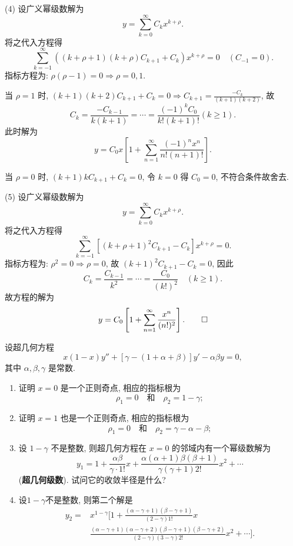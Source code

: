 \begin{solution}
  (4) 设广义幂级数解为
  \[y=\sum_{k=0}^{\infty}C_kx^{k+\rho}.\]
  将之代入方程得
  \[\sum_{k=-1}^{\infty}((k+\rho+1)(k+\rho)C_{k+1}+C_k)x^{k+\rho}=0\quad (C_{-1}=0).\]
  指标方程为: $\rho(\rho-1)=0\Rightarrow\rho=0,1$.

  当 $\rho=1$ 时, $(k+1)(k+2)C_{k+1}+C_k=0\Rightarrow C_{k+1}=\frac{-C_k}{(k+1)(k+2)}$, 故
  \[C_k=\frac{-C_{k-1}}{k(k+1)}=\cdots=\frac{(-1)^kC_0}{k!(k+1)!}(k\geq1).\]
  此时解为
  \[y=C_0x\left[1+\sum_{n=1}^{\infty}\frac{(-1)^nx^n}{n!(n+1)!}\right].\]

  当 $\rho=0$ 时, $(k+1)kC_{k+1}+C_k=0$, 令 $k=0$ 得 $C_0=0$, 不符合条件故舍去.

  (5) 设广义幂级数解为
  \[y=\sum_{k=0}^{\infty}C_kx^{k+\rho}.\]
  将之代入方程得
  \[\sum_{k=-1}^{\infty}\left[(k+\rho+1)^2C_{k+1}-C_k\right]x^{k+\rho}=0.\]
  指标方程为: $\rho^2=0\Rightarrow\rho=0$, 故 $(k+1)^2C_{k+1}-C_k=0$, 因此
  \[C_k=\frac{C_{k-1}}{k^2}=\cdots=\frac{C_0}{(k!)^2}\quad (k\geq 1).\]
  故方程的解为
  \[y=C_0\left[1+\sum_{n=1}^{\infty}\frac{x^n}{(n!)^2}\right].\qedhere\]
\end{solution}



\begin{exercise}
  设超几何方程
  \[x(1-x)y''+[\gamma-(1+\alpha+\beta)]y'-\alpha\beta y=0,\]
  其中 $\alpha,\beta,\gamma$ 是常数.
  \begin{enumerate}[(1)]
    \item 证明 $x=0$ 是一个正则奇点, 相应的指标根为
      \[\rho_1=0\quad\text{和}\quad\rho_2=1-\gamma;\]
    \item 证明 $x=1$ 也是一个正则奇点, 相应的指标根为
      \[\rho_1=0\quad\text{和}\quad\rho_2=\gamma-\alpha-\beta;\]
    \item 设 $1-\gamma$ 不是整数, 则超几何方程在 $x=0$ 的邻域内有一个幂级数解为
      \[y_1=1+\frac{\alpha\beta}{\gamma\cdot1!}x+\frac{\alpha(\alpha+1)\beta(\beta+1)}{\gamma(\gamma+1)2!}x^2+\cdots\]
      (\textbf{超几何级数}). 试问它的收敛半径是什么?
    \item 设$1-\gamma$不是整数, 则第二个解是
      \[\begin{split}
      y_2=&x^{1-\gamma}\bigg[1+\frac{(\alpha-\gamma+1)(\beta-\gamma+1)}{(2-\gamma)1!}x\\
      &\frac{(\alpha-\gamma+1)(\alpha-\gamma+2)(\beta-\gamma+1)(\beta-\gamma+2)}{(2-\gamma)(3-\gamma)2!}x^2+\cdots\bigg].
      \end{split}\]
  \end{enumerate}
\end{exercise}

